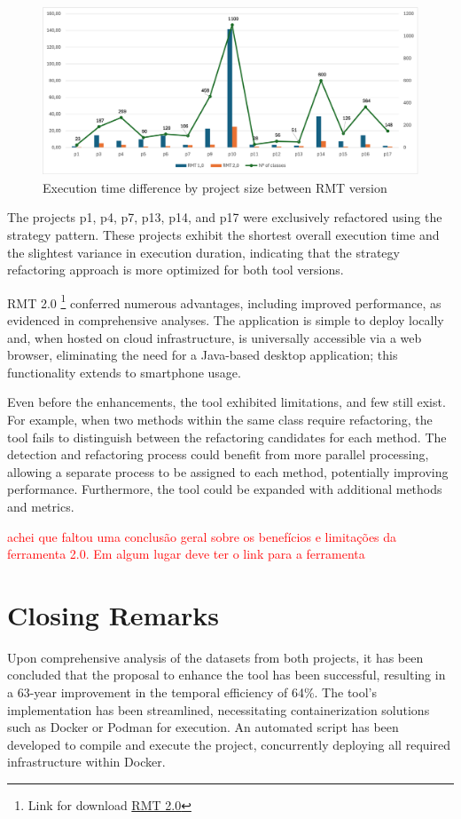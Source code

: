 \begin{figure}[ht!]
\caption{Execution time difference by project size between RMT version}
\label{fig-time-by-size}
\includegraphics[width =\textwidth]{Chapter-5/Figures/time-per-project-size.png}
\end{figure}
\FloatBarrier

The projects p1, p4, p7, p13, p14, and p17 were exclusively refactored using the strategy pattern. These projects exhibit the shortest overall execution time and the slightest variance in execution duration, indicating that the strategy refactoring approach is more optimized for both tool versions. 

RMT 2.0 \footnote{Link for download \href{https://github.com/magnuspedro/spring-rmt}{RMT 2.0}} conferred numerous advantages, including improved performance, as evidenced in comprehensive analyses. The application is simple to deploy locally and, when hosted on cloud infrastructure, is universally accessible via a web browser, eliminating the need for a Java-based desktop application; this functionality extends to smartphone usage.

Even before the enhancements, the tool exhibited limitations, and few still exist. For example, when two methods within the same class require refactoring, the tool fails to distinguish between the refactoring candidates for each method. The detection and refactoring process could benefit from more parallel processing, allowing a separate process to be assigned to each method, potentially improving performance. Furthermore, the tool could be expanded with additional methods and metrics.

\textcolor{red}{achei que faltou uma conclusão geral sobre os benefícios e limitações da ferramenta 2.0. Em algum lugar deve ter o link para a ferramenta}

\section{Closing Remarks}
\label{sec-closing-results}

Upon comprehensive analysis of the datasets from both projects, it has been concluded that the proposal to enhance the tool has been successful, resulting in a 63-year improvement in the temporal efficiency of 64\%. The tool's implementation has been streamlined, necessitating containerization solutions such as Docker or Podman for execution. An automated script has been developed to compile and execute the project, concurrently deploying all required infrastructure within Docker.